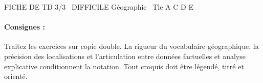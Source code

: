 \documentclass[11pt]{article}
\begin{document}
\begin{tcolorbox}[enhanced,colback=popink,colframe=popink,arc=10pt,boxrule=0pt,left=12pt,right=12pt,top=9pt,bottom=9pt]
{\color{white}\popxbold\small FICHE DE TD 3/3 \textbullet\ DIFFICILE \hfill Géographie \textbullet\ Tle A C D E\par}
\end{tcolorbox}
\vspace{4pt}
\paragraph{Consignes :} Traitez les exercices sur copie double. La rigueur du vocabulaire géographique, la précision des localisations et l'articulation entre données factuelles et analyse explicative conditionnent la notation. Tout croquis doit être légendé, titré et orienté.
\end{document}
